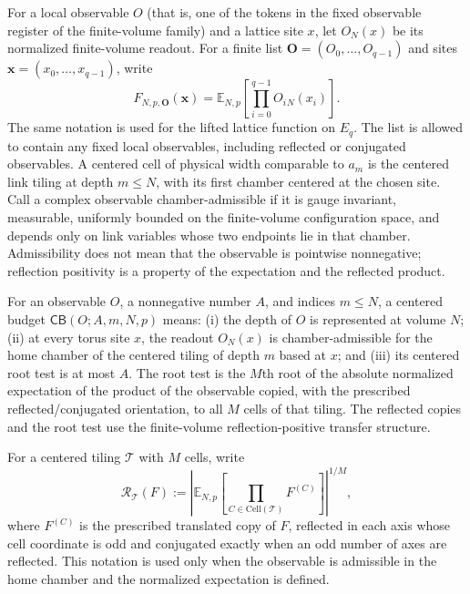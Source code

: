 For a local observable $O$ (that is, one of the tokens in the fixed observable register of the finite-volume family) and a lattice site $x$, let $O_N(x)$ be its normalized finite-volume readout. For a finite list $\mathbf O=(O_0,\ldots,O_{q-1})$ and sites $\mathbf x=(x_0,\ldots,x_{q-1})$, write
\[
  F_{N,p,\mathbf O}(\mathbf x)
  =\mathbb E_{N,p}\!\left[\prod_{i=0}^{q-1}O_i{}_N(x_i)\right].
\]
The same notation is used for the lifted lattice function on $E_q$. The list is allowed to contain any fixed local observables, including reflected or conjugated observables. A centered cell of physical width comparable to $a_m$ is the centered link tiling at depth $m\leq N$, with its first chamber centered at the chosen site. Call a complex observable chamber-admissible if it is gauge invariant, measurable, uniformly bounded on the finite-volume configuration space, and depends only on link variables whose two endpoints lie in that chamber. Admissibility does not mean that the observable is pointwise nonnegative; reflection positivity is a property of the expectation and the reflected product.

\begin{definition}\label{ex-centered-budget}
For an observable $O$, a nonnegative number $A$, and indices $m\leq N$, a centered budget $\mathsf{CB}(O;A,m,N,p)$ means: (i) the depth of $O$ is represented at volume $N$; (ii) at every torus site $x$, the readout $O_N(x)$ is chamber-admissible for the home chamber of the centered tiling of depth $m$ based at $x$; and (iii) its centered root test is at most $A$. The root test is the $M$th root of the absolute normalized expectation of the product of the observable copied, with the prescribed reflected/conjugated orientation, to all $M$ cells of that tiling. The reflected copies and the root test use the finite-volume reflection-positive transfer structure.
\end{definition}

For a centered tiling $\mathcal T$ with $M$ cells, write
\[
 \mathcal R_{\mathcal T}(F)
 :=\left|\mathbb E_{N,p}\left[\prod_{C\in\mathrm{Cell}(\mathcal T)} F^{(C)}\right]\right|^{1/M},
\]
where $F^{(C)}$ is the prescribed translated copy of $F$, reflected in each axis whose cell coordinate is odd and conjugated exactly
when an odd number of axes are reflected. This notation is used only when the observable is admissible in the home chamber and the normalized expectation is defined.

